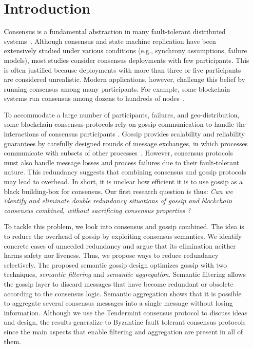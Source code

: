 \section{Introduction}
\label{sec:intro}

Consensus is a fundamental abstraction in many fault-tolerant distributed systems~\cite{Lam78,schneider90}. 
Although consensus and state machine replication have been extensively studied under various conditions (e.g., synchrony assumptions, failure models), most studies consider consensus deployments with few participants. 
This is often justified because deployments with more than three or five participants are considered unrealistic.
Modern applications, however, challenge this belief by running consensus among many participants.
For example, some blockchain systems run consensus among dozens to hundreds of nodes~\cite{bucham18,buterin17,libra18}.

To accommodate a large number of participants, failures, and geo-distribution, some blockchain consensus protocols rely on gossip communication to handle the interactions of consensus participants \cite{Hyperledger,bucham18,buterin17,libra18}.
Gossip provides scalability and reliability guarantees by carefully designed rounds of message exchanges, in which processes communicate with subsets of other processes~\cite{demers87, Birman99}.
However, consensus protocols must also handle message losses and process failures due to their fault-tolerant nature.
This redundancy suggests that combining consensus and gossip protocols may lead to overhead.
In short, it is unclear how efficient it is to use gossip as a black building-box for consensus.  Our first research question is thus:
\emph{Can we identify and eliminate double redundancy situations of gossip and blockchain consensus combined, without sacrificing consensus properties ?}

To tackle this problem, we look into consensus and gossip combined.
The idea is to reduce the overhead of gossip by exploiting consensus semantics.  We identify concrete cases of unneeded redundancy and argue that its elimination neither harms safety nor liveness.  Thus, we propose ways to reduce redundancy selectively.
The proposed semantic gossip design optimizes gossip with two techniques, \emph{semantic filtering} and \emph{semantic aggregation}.
Semantic filtering allows the gossip layer to discard messages that have become redundant or obsolete according to the consensus logic.
Semantic aggregation shows that it is possible to aggregate several consensus messages into a single message without losing information. 
%
Although we use the Tendermint consensus protocol \cite{buchman2019latestgossipbftconsensus} to discuss ideas and design, the results generalize to Byzantine fault tolerant consensus protocols since the main aspects that enable filtering and aggregation are present in all of them. 

